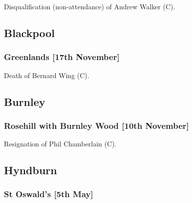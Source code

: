 \documentclass[a4paper,openany]{book}
\begin{document}
\begin{resultsiii}

Disqualification (non-attendance) of Andrew Walker (C).

\subsection*{Blackpool}

\subsubsection*{Greenlands \hspace*{\fill}\nolinebreak[1]%
	\enspace\hspace*{\fill}
	[17th November]}


Death of Bernard Wing (C).

\subsection*{Burnley}

\subsubsection*{Rosehill with Burnley Wood \hspace*{\fill}\nolinebreak[1]%
	\enspace\hspace*{\fill}
	[10th November]}


Resignation of Phil Chamberlain (C).

\subsection*{Hyndburn}

\subsubsection*{St Oswald's \hspace*{\fill}\nolinebreak[1]%
	\enspace\hspace*{\fill}
	[5th May]}



\end{resultsiii}
\end{document}
